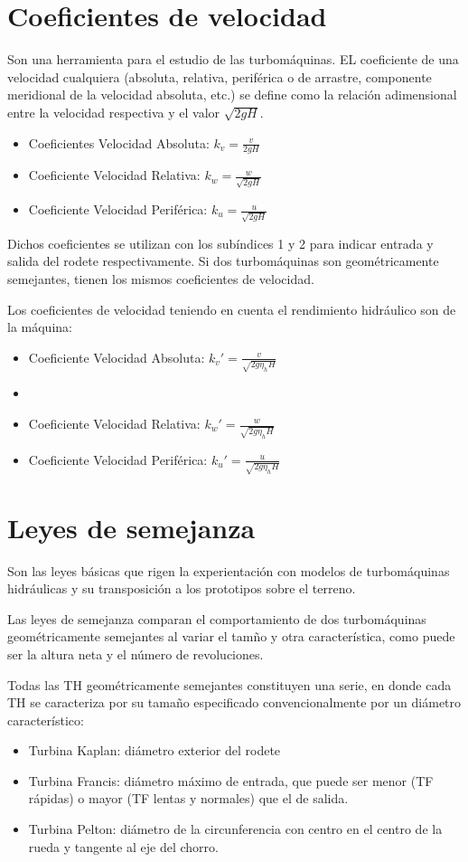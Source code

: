 \section{Coeficientes de velocidad}
Son una herramienta para el estudio de las turbomáquinas. EL coeficiente de una velocidad cualquiera (absoluta, relativa, periférica o de arrastre, componente meridional de la velocidad absoluta, etc.) se define como la relación adimensional entre la velocidad respectiva y el valor $\sqrt{2gH}$.
\begin{itemize}
    \item Coeficientes Velocidad Absoluta: $k_v = \frac{v}{2 g H}$
    \item Coeficiente Velocidad Relativa: $k_w = \frac{w}{\sqrt{2 g H}}$
    \item Coeficiente Velocidad Periférica: $k_u = \frac{u}{\sqrt{2 g H}}$
\end{itemize}
Dichos coeficientes se utilizan con los subíndices 1 y 2 para indicar entrada y salida del rodete respectivamente. Si dos turbomáquinas son geométricamente semejantes, tienen los mismos coeficientes de velocidad.

Los coeficientes de velocidad teniendo en cuenta el rendimiento hidráulico son de la máquina:
\begin{itemize}
    \item Coeficiente Velocidad Absoluta: $k_v' = \frac{v}{\sqrt{2 g \eta_h H}}$
    \item \item Coeficiente Velocidad Relativa: $k_w' = \frac{w}{\sqrt{2 g \eta_h H}}$
    \item Coeficiente Velocidad Periférica: $k_u' = \frac{u}{\sqrt{2 g \eta_h H}}$
\end{itemize}

\section{Leyes de semejanza}
Son las leyes básicas que rigen la experientación con modelos de turbomáquinas hidráulicas y su transposición a los prototipos sobre el terreno.

Las leyes de semejanza comparan el comportamiento de dos turbomáquinas geométricamente semejantes al variar el tamño y otra característica, como puede ser la altura neta y el número de revoluciones.

Todas las TH geométricamente semejantes constituyen una serie, en donde cada TH se caracteriza por su tamaño especificado convencionalmente por un diámetro característico:
\begin{itemize}
    \item Turbina Kaplan: diámetro exterior del rodete
    \item Turbina Francis: diámetro máximo de entrada, que puede ser menor (TF rápidas) o mayor (TF lentas y normales) que el de salida.
    \item Turbina Pelton: diámetro de la circunferencia con centro en el centro de la rueda y tangente al eje del chorro.
\end{itemize}


